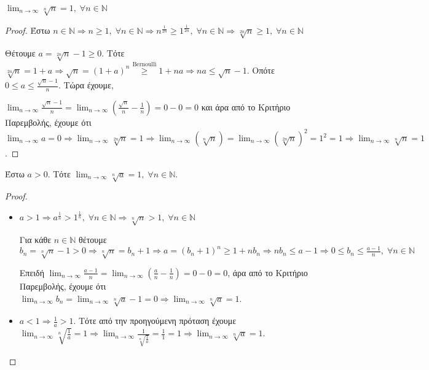 \documentclass[main.tex]{subfiles}
\begin{document}
\begin{prop}
    $ \lim_{n \to \infty} \sqrt[n]{n} = 1, \; \forall n \in \mathbb{N}  $
\end{prop}

\begin{proof}
    Έστω $ n \in \mathbb{N} \Rightarrow n \geq 1, \; \forall n \in \mathbb{N}
    \Rightarrow n ^{\frac{1}{2n}} \geq 1^{\frac{1}{2n}}, \; \forall n 
    \in \mathbb{N} \Rightarrow \sqrt[2n]{n} \geq 1, \; \forall n \in 
    \mathbb{N} $

    Θέτουμε $ a = \sqrt[2n]{n} -1 \geq 0 $. Τότε $ \sqrt[2n]{n} = 1 + a 
    \Rightarrow \sqrt{n} = (1+a)^{n} \overset{\text{Bernoulli}}{\geq} 1 
    + na \Rightarrow na \leq \sqrt{n} - 1  $. Οπότε $ 0 \leq a \leq
    \frac{\sqrt{n} -1}{n} $. Τώρα έχουμε, 

    $ \lim_{n \to \infty} \frac{\sqrt{n} -1}{n} = \lim_{n \to \infty} 
    \left( \frac{\sqrt{n}}{n} - \frac{1}{n}\right) = 0 - 0 = 0 $ και 
    άρα από το Κριτήριο Παρεμβολής, έχουμε ότι $ \lim_{n \to \infty} a = 0 
    \Rightarrow \lim_{n \to \infty} \sqrt[2n]{n} = 1 \Rightarrow \lim_{n \to
    \infty} (\sqrt[n]{n}) = \lim_{n \to \infty} (\sqrt[2n]{n})^{2} =  1^{2} = 1 \Rightarrow \lim_{n \to \infty}
    \sqrt[n]{n} =1 $.
\end{proof}

\begin{prop}
    Έστω $ a>0 $. Τότε $ \lim_{n \to \infty} \sqrt[n]{a}=1, \; \forall n \in
    \mathbb{N} $.
\end{prop}

\begin{proof}
\item {}
    \begin{itemize}
    \item $ a>1 \Rightarrow a^{\frac{1}{n}} > 1^{\frac{1}{n}}, \; \forall n
            \in \mathbb{N} \Rightarrow \sqrt[n]{n} >1, \; \forall n \in
            \mathbb{N} $

            Για κάθε $ n \in \mathbb{N} $ θέτουμε $ b_{n} = \sqrt[n]{n} -1 
            > 0 \Rightarrow \sqrt[n]{n} = b_{n} + 1 \Rightarrow a = (
            b_{n}+1)^{n} \geq 1 + n b_{n} \Rightarrow n b_{n} \leq a-1
            \Rightarrow 0 \leq b_{n} \leq \frac{a-1}{n}, \; \forall n \in
            \mathbb{N} $

            Επειδή $ \lim_{n \to \infty} \frac{a-1}{n} = \lim_{n \to \infty}
            (\frac{a}{n} - \frac{1}{n}) = 0 - 0 = 0 $, άρα από το 
            Κριτήριο Παρεμβολής, έχουμε ότι $ \lim_{n \to \infty} b_{n} = 
            \lim_{n \to \infty} \sqrt[n]{a}-1 = 0 \Rightarrow \lim_{n \to
        \infty} \sqrt[n]{a} =1 $.

    \item $ a< 1 \Rightarrow \frac{1}{a} > 1 $. Τότε από την προηγούμενη πρόταση
        έχουμε 
        $ \lim_{n \to \infty} \sqrt[n]{\frac{1}{a} } = 1 \Rightarrow \lim_{n \to
        \infty} \frac{1}{\sqrt[n]{\frac{1}{a}}} = \frac{1}{1} = 1 \Rightarrow
        \lim_{n \to \infty} \sqrt[n]{a} = 1$.
    \end{itemize}
\end{proof}
\end{document}
